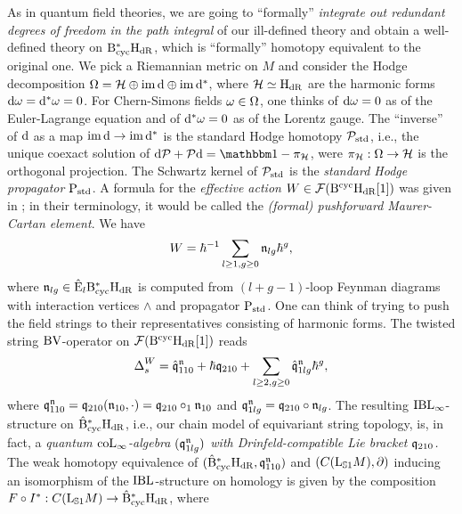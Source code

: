 \documentclass[\MainFolder/Text.tex]{subfiles}
\begin{document}

As in quantum field theories, we are going to ``formally'' \emph{integrate out redundant degrees of freedom in the path integral} of our ill-defined theory and obtain a well-defined theory on $\mathrm{B}_{\mathrm{cyc}}^*\mathrm{H}_{\mathrm{dR}}$, which is ``formally'' homotopy equivalent to the original one. We pick a Riemannian metric on $M$ and consider the Hodge decomposition $\Omega = \mathcal{H} \oplus \operatorname{im}\mathrm{d} \oplus \operatorname{im}\mathrm{d}^*$, where $\mathcal{H} \simeq \mathrm{H}_{\mathrm{dR}}$ are the harmonic forms $\mathrm{d} \omega = \mathrm{d}^* \omega = 0$. For Chern-Simons fields $\omega\in \Omega$, one thinks of $\mathrm{d} \omega = 0$ as of the Euler-Lagrange equation and of $\mathrm{d}^* \omega = 0$ as of the Lorentz gauge. The ``inverse'' of $\mathrm{d}$ as a map $\operatorname{im}\mathrm{d} \rightarrow \operatorname{im} \mathrm{d}^*$ is the standard Hodge homotopy $\mathcal{P}_{\mathrm{std}}$, i.e., the unique coexact solution of $\Dd \Htp + \Htp \Dd = \Id - \pi_\Harm$, were $\pi_{\mathcal{H}}: \Omega \rightarrow \mathcal{H}$ is the orthogonal projection. The Schwartz kernel of $\mathcal{P}_{\mathrm{std}}$ is the \emph{standard Hodge propagator} $\mathrm{P}_{\mathrm{std}}$. A formula for the \emph{effective action} $W\in\mathcal{F}(\mathrm{B}^{\mathrm{cyc}}\mathrm{H}_{\mathrm{dR}}[1])$ was given in \cite{Cieliebak2015}; in their terminology, it would be called the \emph{(formal) pushforward Maurer-Cartan element}. We have
\[ W = \hbar^{-1}\sum_{l\ge 1, g\ge 0} \mathfrak{n}_{lg} \hbar^{g}, \]
where $\mathfrak{n}_{lg} \in \hat{\mathrm{E}}_l \mathrm{B}_{\mathrm{cyc}}^*\mathrm{H}_{\mathrm{dR}}$ is computed from $(l+g-1)$-loop Feynman diagrams with interaction vertices $\wedge$ and propagator $\mathrm{P}_{\mathrm{std}}$. One can think of trying to push the field strings to their representatives consisting of harmonic forms. The twisted string $\mathrm{BV}$-operator on $\mathcal{F}(\mathrm{B}^{\mathrm{cyc}}\mathrm{H}_{\mathrm{dR}}[1])$ reads
\[ \operatorname{\Delta}^W_s = \hat{\mathfrak{q}}^{\mathfrak{n}}_{110}  +  \hbar{\mathfrak{q}}_{210} + \sum_{l\ge 2, g\ge 0} \hat{\mathfrak{q}}^{\mathfrak{n}}_{1lg} \hbar^{g}, \]
where $\mathfrak{q}_{110}^{\mathfrak{n}} = \mathfrak{q}_{210}(\mathfrak{n}_{10},\cdot) = \mathfrak{q}_{210}\circ_1 \mathfrak{n}_{10}$ and $\mathfrak{q}_{1lg}^{\mathfrak{n}} = \mathfrak{q}_{210}\circ \mathfrak{n}_{lg}$. The resulting $\mathrm{IBL}_\infty$-structure on $\hat{\mathrm{B}}_{\mathrm{cyc}}^*\mathrm{H}_{\mathrm{dR}}$, i.e., our chain model of equivariant string topology, is, in fact, a \emph{quantum $\mathrm{coL}_\infty$-algebra $(\mathfrak{q}_{1lg}^{\mathfrak{n}})$ with Drinfeld-compatible Lie bracket $\mathfrak{q}_{210}$.} The weak homotopy equivalence of $(\hat{\mathrm{B}}_{\mathrm{cyc}}^*\mathrm{H}_{\mathrm{dR}},\mathfrak{q}_{110}^{\mathfrak{n}})$ and $(C(\mathrm{L}_{\mathbb{S}{1}} M),\partial)$ inducing an isomorphism of the $\mathrm{IBL}$-structure on homology is given by the composition $F\circ I^*: C(\mathrm{L}_{\mathbb{S}{1}} M) \rightarrow \hat{\mathrm{B}}_{\mathrm{cyc}}^* \mathrm{H}_{\mathrm{dR}}$, where 
\end{document}
